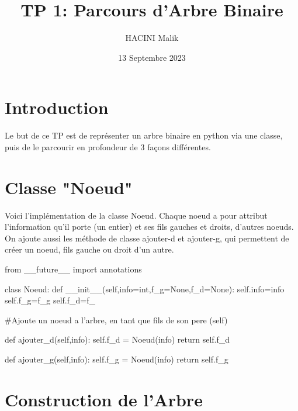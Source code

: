 \documentclass{article}
\title{TP 1: Parcours d'Arbre Binaire}
\author{HACINI Malik}
\date{13 Septembre 2023}
\begin{document}
\maketitle
\tableofcontents{}

\section{Introduction}

Le but de ce TP est de représenter un arbre binaire en python via une classe,
puis de le parcourir en profondeur de 3 façons différentes.



\section{Classe "Noeud"}
Voici l'implémentation de la classe Noeud.
Chaque noeud a pour attribut l'information qu'il porte (un entier) 
et ses fils gauches et droits, d'autres noeuds.
On ajoute aussi les méthode de classe ajouter-d et ajouter-g, qui
permettent de créer un noeud, fils gauche ou droit d'un autre.

\begin{python}
    from __future__ import annotations

class Noeud:
    def __init__(self,info=int,f_g=None,f_d=None):
        self.info=info
        self.f_g=f_g
        self.f_d=f_
        
    #Ajoute un noeud a l'arbre, en tant que fils de son pere (self)

    def ajouter_d(self,info):
        self.f_d = Noeud(info)
        return self.f_d
    
    def ajouter_g(self,info):
        self.f_g = Noeud(info)
        return self.f_g

\end{python}

\section{Construction de l'Arbre}
\end{document}
